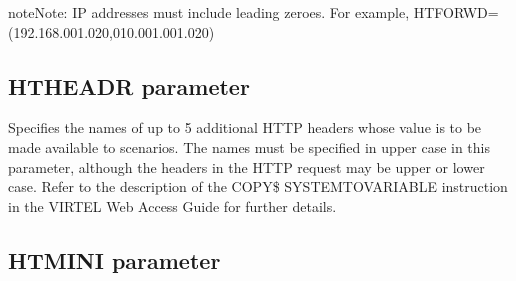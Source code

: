 \documentclass[letterpaper,10pt,english]{sphinxmanual}
\begin{document}
\begin{sphinxadmonition}{note}{Note:}
\sphinxAtStartPar
IP addresses must include leading zeroes. For example, HTFORWD=(192.168.001.020,010.001.001.020)
\end{sphinxadmonition}

\ignorespaces 

\subsection{HTHEADR parameter}
\label{\detokenize{Installation_Guide:htheadr-parameter}}\label{\detokenize{Installation_Guide:index-77}}
\begin{sphinxVerbatim}[commandchars=\\\{\}]
                
\end{sphinxVerbatim}

\sphinxAtStartPar
{} \sphinxhyphen{} Specifies the names of up to 5 additional HTTP headers whose value is to be made available to scenarios. The names must be specified in upper case in this parameter, although the headers in the HTTP request may be upper or lower case. Refer to the description of the COPY\$ SYSTEM\sphinxhyphen{}TO\sphinxhyphen{}VARIABLE instruction in the VIRTEL Web Access Guide for further details.

\ignorespaces 

\subsection{HTMINI parameter}
\label{\detokenize{Installation_Guide:htmini-parameter}}\label{\detokenize{Installation_Guide:index-78}}
\begin{sphinxVerbatim}[commandchars=\\\{\}]
                  
\end{sphinxVerbatim}
\end{document}

